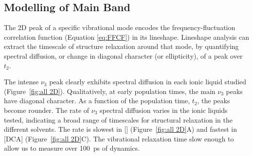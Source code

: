 {\subsection{Modelling of Main Band}
\label{sec:anions_2DIR_analysis}
The 2D peak of a specific vibrational mode encodes the frequency-fluctuation correlation function (Equation \ref{eq:FFCF}) in its lineshape. Lineshape analysis can extract the timescale of structure relaxation around that mode, by quantifying spectral diffusion, or change in diagonal character (or ellipticity), of a peak over \(t_2\).

The intense \(\nu_3\) peak clearly exhibits spectral diffusion in each ionic liquid studied (Figure~\ref{fig:all 2D}). Qualitatively, at early population times, the main \(\nu_3\) peaks have diagonal character. As a function of the population time, \(t_2\), the peaks become rounder. The rate of \(\nu_3\) spectral diffusion varies in the ionic liquids tested, indicating a broad range of timescales for structural relaxation in the different solvents. The rate is slowest in \ce{[Im_{4,1}]}[] (Figure~\ref{fig:all 2D}A) and fastest in \ce{[Im_{4,1}]}[DCA] (Figure~\ref{fig:all 2D}C). The vibrational relaxation time slow enough to allow us to measure over \SI{100}{\ps} of dynamics.

}
